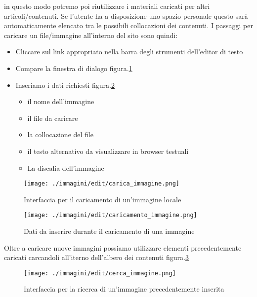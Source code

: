 in questo modo potremo poi riutilizzare i materiali caricati per altri articoli/contenuti. Se l'utente ha a disposizione uno spazio personale questo sarà automaticamente elencato tra le possibili collocazioni dei contenuti.
I passaggi per caricare un file/immagine all'interno del sito sono quindi:
\begin{itemize}
 \item Cliccare sul link appropriato nella barra degli strumenti dell'editor di testo
\item Compare la finestra di dialogo figura.\ref{fig:load_image}
\item Inseriamo i dati richiesti figura.\ref{fig:caricamento_immagine}
  \begin{itemize}
  \item il nome dell'immagine
   \item il file da caricare
  \item la collocazione del file
  \item il testo alternativo da visualizzare in browser testuali
  \item La discalia dell'immagine
  \end{itemize}
\end{itemize}


\begin{figure}[H]
 \centering
 \texttt{[image: ./immagini/edit/carica\_immagine.png]}
 \caption{Interfaccia per il caricamento di un'immagine locale}
 \label{fig:load_image}
\end{figure}


\begin{figure}[H]
 \centering
 \texttt{[image: ./immagini/edit/caricamento\_immagine.png]}
 \caption{Dati da inserire durante il caricamento di una immagine}
 \label{fig:caricamento_immagine}
\end{figure}

Oltre a caricare nuove immagini possiamo utilizzare elementi precedentemente caricati carcandoli all'iterno dell'albero dei contenuti figura.\ref{fig:cerca_immagine}

\begin{figure}[H]
 \centering
 \texttt{[image: ./immagini/edit/cerca\_immagine.png]}
 \caption{Interfaccia per la ricerca di un'immagine precedentemente inserita}
 \label{fig:cerca_immagine}
\end{figure}

